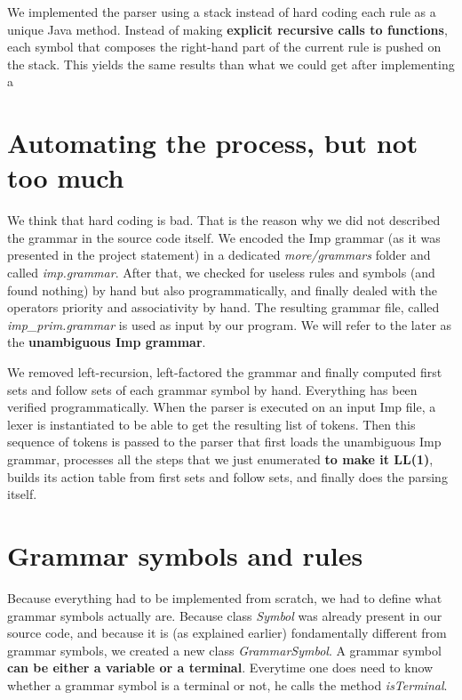 We implemented the parser using a stack instead of hard coding each rule as a unique Java method. Instead of making
\textbf{explicit recursive calls to functions}, each symbol that composes the right-hand part of the current rule is pushed
on the stack. This yields the same results than what we could get after implementing a

\section{Automating the process, but not too much}

We think that hard coding is bad. That is the reason why we did not described the grammar in the source code itself.
We encoded the Imp grammar (as it was presented in the project statement) in a dedicated \textit{more/grammars} folder and called \textit{imp.grammar}.
After that, we checked for useless rules and symbols (and found nothing) by hand but also programmatically, and finally dealed with
the operators priority and associativity by hand. The resulting grammar file, called \textit{imp\_prim.grammar} is used as input by our program.
We will refer to the later as the \textbf{unambiguous Imp grammar}.

We removed left-recursion, left-factored the grammar and finally computed first sets and follow sets of each grammar symbol by hand. 
Everything has been verified programmatically. When the parser is executed on an input Imp file, a lexer is instantiated to be able
to get the resulting list of tokens. Then this sequence of tokens is passed to the parser that first loads the unambiguous Imp grammar,
processes all the steps that we just enumerated \textbf{to make it LL(1)}, 
builds its action table from first sets and follow sets, and finally does the parsing itself.

\section{Grammar symbols and rules}

Because everything had to be implemented from scratch, we had to define what grammar symbols actually are. Because class \textit{Symbol}
was already present in our source code, and because it is (as explained earlier) fondamentally different from grammar symbols,
we created a new class \textit{GrammarSymbol}. A grammar symbol \textbf{can be either a variable or a terminal}. Everytime one does need
to know whether a grammar symbol is a terminal or not, he calls the method \textit{isTerminal}.

